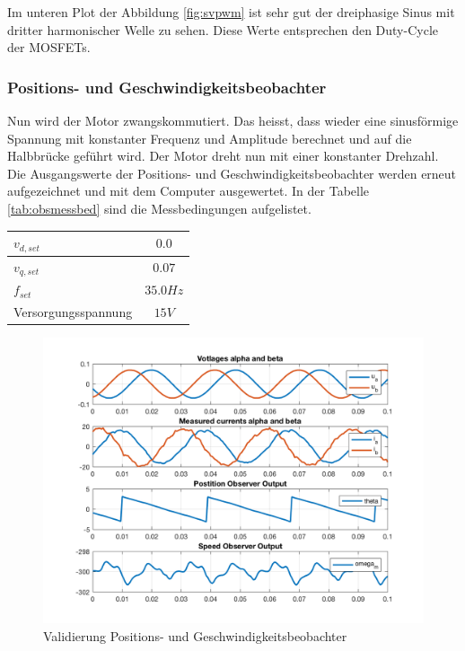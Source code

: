 Im unteren Plot der Abbildung \ref{fig:svpwm} ist sehr gut der dreiphasige Sinus mit dritter harmonischer Welle zu sehen. Diese Werte entsprechen den Duty-Cycle der MOSFETs.

\subsubsection*{Positions- und Geschwindigkeitsbeobachter} \label{val:obs}
Nun wird der Motor zwangskommutiert. Das heisst, dass wieder eine sinusförmige Spannung mit konstanter Frequenz und Amplitude berechnet und auf die Halbbrücke geführt wird. Der Motor dreht nun mit einer konstanter Drehzahl. Die Ausgangswerte der Positions- und Geschwindigkeitsbeobachter werden erneut aufgezeichnet und mit dem Computer ausgewertet. In der Tabelle \ref{tab:obsmessbed} sind die Messbedingungen aufgelistet.

\begin{center}
	\begin{tabular}{l|c}
		\hline 
		$v_{d,set}$ & $0.0$ \\ \hline
		$v_{q,set}$ & $0.07$ \\ \hline
		$f_{set}$ & $35.0Hz$ \\ \hline
		Versorgungsspannung & $15V$ \\ \hline
	\end{tabular} 
	\label{tab:obsmessbed}
\end{center}

\begin{figure} [H]
	\centering
	\includegraphics[width=0.8\linewidth]{images/valmcobserver.png}
	\caption{Validierung Positions- und Geschwindigkeitsbeobachter}
	\label{fig:observer}
\end{figure}

